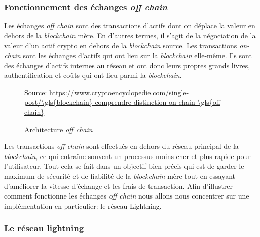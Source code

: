 \subsubsection{Fonctionnement des échanges \textit{\gls{off chain}}}
Les échanges \textit{\gls{off chain}} sont des transactions d'\gls{actif}s dont on déplace la valeur en dehors de la \textit{\gls{blockchain}} mère. En d’autres termes, il s’agit de la négociation de la valeur d’un \gls{actif} crypto en dehors de la \textit{\gls{blockchain}} source. Les transactions \textit{on-chain} sont les échanges d'\gls{actif}s qui ont lieu sur la \textit{\gls{blockchain}} elle-même.
Ils sont des échanges d’\gls{actif}s internes au réseau et ont donc leurs propres grands livres, authentification et coûts qui ont lieu parmi la \textit{\gls{blockchain}}.
\begin{figure}[h!]
    \centering
    {\scriptsize Source: \url{https://www.cryptoencyclopedie.com/single-post/\gls{blockchain}-comprendre-distinction-on-chain-\gls{off chain}}}
    \caption{Architecture \textit{\gls{off chain}}}
    \label{fig:offchain}
\end{figure}
Les transactions \textit{\gls{off chain}} sont effectués en dehors du réseau principal de la \textit{\gls{blockchain}}, ce qui entraîne souvent un processus moins cher et plus rapide pour l’utilisateur. 
Tout cela se fait dans un objectif bien précis qui est de garder le maximum de sécurité et de fiabilité de la \textit{\gls{blockchain}} mère tout en essayant d'améliorer la vitesse d'échange et les frais de transaction.
Afin d'illustrer comment fonctionne les échanges \textit{\gls{off chain}} nous allons nous concentrer sur une implémentation en particulier: le réseau Lightning. 

\subsubsection{Le réseau lightning}

